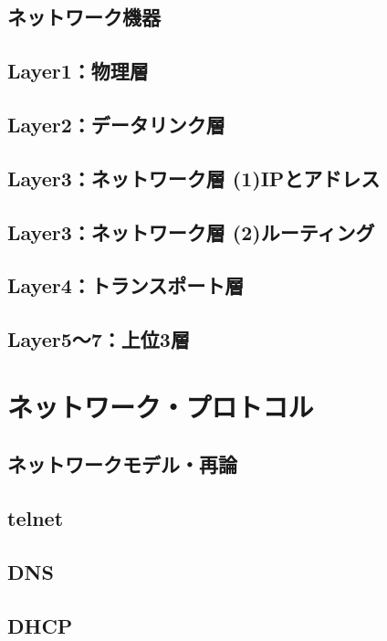 \documentclass[a4j,12pt]{jreport}
\begin{document}
\chapter{ネットワーク機器}

\chapter{Layer1：物理層}

\chapter{Layer2：データリンク層}

\chapter{Layer3：ネットワーク層 (1)IPとアドレス}

\chapter{Layer3：ネットワーク層 (2)ルーティング}

\chapter{Layer4：トランスポート層}

\chapter{Layer5〜7：上位3層}


\part{ネットワーク・プロトコル}

\chapter{ネットワークモデル・再論}

\chapter{telnet}

\chapter{DNS}

\chapter{DHCP}
\end{document}
